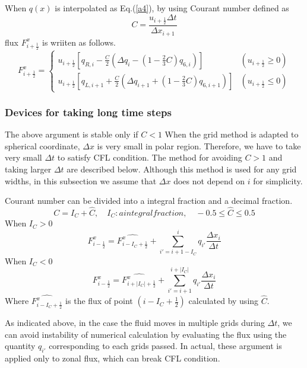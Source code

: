 \documentclass{article}
\begin{document}
When $q(x)$ is interpolated as Eq.(\ref{a4}), by using Courant number defined as
\begin{equation}
  C=\frac{u_{i+\frac{1}{2}}\Delta t}{\Delta x_{i+1}}
\end{equation}
flux $F^{x}_{i+\frac{1}{2}}$ is wriiten as follows.
\begin{equation}
  F^{x}_{i+\frac{1}{2}}=\begin{cases}u_{i+\frac{1}{2}}[q_{R,i}-\frac{C}{2}(\Delta q_{i}-(1-\frac{2}{3}C)q_{6,i})] & (u_{i+\frac{1}{2}}\ge0)\\
  u_{i+\frac{1}{2}}[q_{L,i+1}+\frac{C}{2}(\Delta q_{i+1}+(1-\frac{2}{3}C)q_{6,i+1})] & (u_{i+\frac{1}{2}}\leq0)
  \end{cases}
\end{equation}
\subsubsection{Devices for taking long time steps}
The above argument is stable only if $C<1$
When the grid method is adapted to spherical coordinate, $\Delta x$ is very small in polar region.
Therefore, we have to take very small $\Delta t$ to satisfy CFL condition. 
The method for avoiding $C>1$ and taking larger $\Delta t$ are described below.
Although this method is used for any grid widths, in this subsection we assume that $\Delta x$ does not depend on $i$ for simplicity. 

Courant number can be divided into a integral fraction and a decimal fraction. 
\begin{equation}
  C=I_{C}+\hat{C},\quad I_{C}: a integral fraction,\quad -0.5\le \hat{C} \le 0.5
\end{equation}
When $I_{C}>0$
\begin{equation}
  F^{x}_{i-\frac{1}{2}}=\hat{F^{x}_{i-I_{C}+\frac{1}{2}}}+\sum^{i}_{i'=i+1-I_{C}} q_{i'} \frac{\Delta x_{i}}{\Delta t}
\end{equation}
When $I_{C}<0$
\begin{equation}
  F^{x}_{i-\frac{1}{2}}=\hat{F^{x}_{i+|I_{C}|+\frac{1}{2}}}+\sum^{i+|I_{C}|}_{i'=i+1} q_{i'} \frac{\Delta x_{i}}{\Delta t}
\end{equation}
Where $\hat{F^{x}_{i-I_{C}+\frac{1}{2}}}$ is the flux of point $(i-I_{C}+\frac{1}{2})$ calculated by using $\hat{C}$.

As indicated above, in the case the fluid moves in multiple grids during $\Delta t$, we can avoid instability of numerical calculation by evaluating the flux using the quantity $q_{i'}$ corresponding to each grids passed.
In actual, these argument is applied only to zonal flux, which can break CFL condition.
\end{document}

